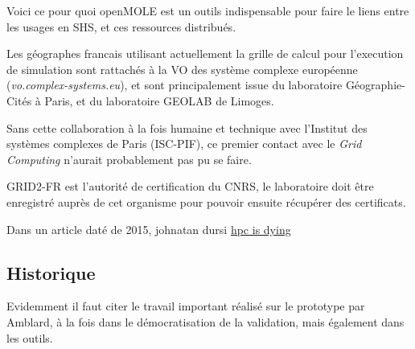 

Voici ce pour quoi openMOLE est un outils indispensable pour faire le liens entre les usages en SHS, et ces ressources distribués.

Les géographes francais utilisant actuellement la grille de calcul pour l'execution de simulation sont rattachés à la VO des système complexe européenne (\textit{vo.complex-systems.eu}), et sont principalement issue du laboratoire Géographie-Cités à Paris, et du laboratoire GEOLAB de Limoges.

Sans cette collaboration à la fois humaine et technique avec l'Institut des systèmes complexes de Paris (ISC-PIF), ce premier contact avec le \textit{Grid Computing} n'aurait probablement pas pu se faire.


GRID2-FR est l'autorité de certification du CNRS, le laboratoire doit être enregistré auprès de cet organisme pour pouvoir ensuite récupérer des certificats.


Dans un article daté de 2015, johnatan dursi
\href{http://www.dursi.ca/hpc-is-dying-and-mpi-is-killing-it/}{hpc is dying}

\subsection{Historique}

Evidemment il faut citer le travail important réalisé sur le prototype par Amblard, à la fois dans le démocratisation de la validation, mais également dans les outils.

